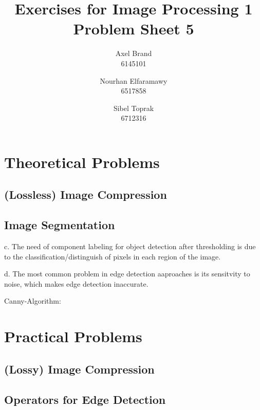 \documentclass[a4paper,twocolumn]{article}
\title{\textbf{Exercises for Image Processing 1}\\Problem Sheet 5}
\author{Axel Brand\\6145101 \and Nourhan Elfaramawy\\6517858 \and Sibel Toprak\\6712316}
\begin{document}
	\maketitle
	
	\section{Theoretical Problems}

	

	
	\subsection{(Lossless) Image Compression}
	
	\subsection{Image Segmentation}
	
	c. The need of component labeling for object detection after thresholding is due to the classification/distinguish of pixels in each region of the image.
	
	d. The most common problem in edge detection aaproaches is its sensitvity to noise, which makes edge detection inaccurate.
	
	Canny-Algorithm:
	
	
	\section{Practical Problems}
	
	\subsection{(Lossy) Image Compression}
	
	\subsection{Operators for Edge Detection}
	
\end{document}
